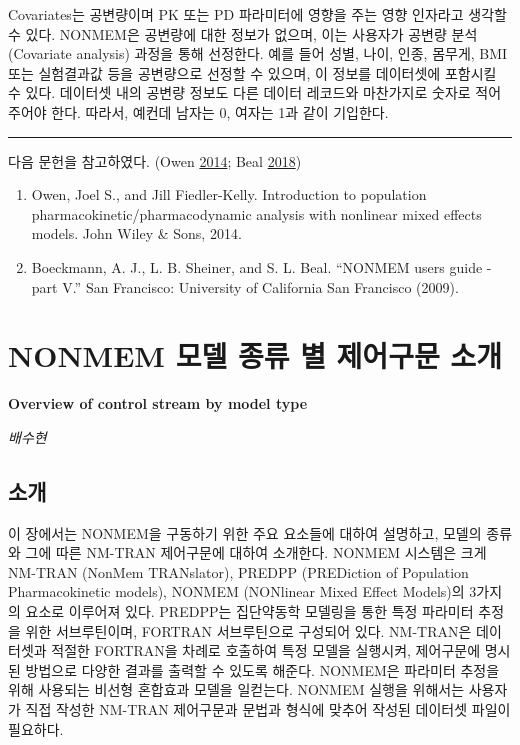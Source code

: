 \documentclass[
  10pt,
]{krantz}
\providecommand{\tightlist}{%
  \setlength{\itemsep}{0pt}\setlength{\parskip}{0pt}}
\begin{document}
Covariates는 공변량이며 PK 또는 PD 파라미터에 영향을 주는 영향 인자라고 생각할 수 있다. NONMEM은 공변량에 대한 정보가 없으며, 이는 사용자가 공변량 분석(Covariate analysis) 과정을 통해 선정한다. 예를 들어 성별, 나이, 인종, 몸무게, BMI 또는 실험결과값 등을 공변량으로 선정할 수 있으며, 이 정보를 데이터셋에 포함시킬 수 있다. 데이터셋 내의 공변량 정보도 다른 데이터 레코드와 마찬가지로 숫자로 적어주어야 한다. 따라서, 예컨데 남자는 0, 여자는 1과 같이 기입한다.

\begin{center}\rule{0.5\linewidth}{0.5pt}\end{center}

다음 문헌을 참고하였다. (Owen \protect\hyperlink{ref-kelly}{2014}; Beal \protect\hyperlink{ref-nonmem}{2018})

\begin{enumerate}
\def\labelenumi{\arabic{enumi}.}
\tightlist
\item
  Owen, Joel S., and Jill Fiedler-Kelly. Introduction to population pharmacokinetic/pharmacodynamic analysis with nonlinear mixed effects models. John Wiley \& Sons, 2014.
\item
  Boeckmann, A. J., L. B. Sheiner, and S. L. Beal. ``NONMEM users guide - part V.'' San Francisco: University of California San Francisco (2009).
\end{enumerate}

\hypertarget{control-stream}{%
\chapter{NONMEM 모델 종류 별 제어구문 소개}\label{control-stream}}

\textbf{Overview of control stream by model type}

\emph{배수현}

\hypertarget{uxc18cuxac1c-1}{%
\section{소개}\label{uxc18cuxac1c-1}}

이 장에서는 NONMEM을 구동하기 위한 주요 요소들에 대하여 설명하고, 모델의 종류와 그에 따른 NM-TRAN 제어구문에 대하여 소개한다. NONMEM 시스템은 크게 NM-TRAN (NonMem TRANslator), PREDPP (PREDiction of Population Pharmacokinetic models), NONMEM (NONlinear Mixed Effect Models)의 3가지의 요소로 이루어져 있다. PREDPP는 집단약동학 모델링을 통한 특정 파라미터 추정을 위한 서브루틴이며, FORTRAN 서브루틴으로 구성되어 있다. NM-TRAN은 데이터셋과 적절한 FORTRAN을 차례로 호출하여 특정 모델을 실행시켜, 제어구문에 명시된 방법으로 다양한 결과를 출력할 수 있도록 해준다. NONMEM은 파라미터 추정을 위해 사용되는 비선형 혼합효과 모델을 일컫는다. NONMEM 실행을 위해서는 사용자가 직접 작성한 NM-TRAN 제어구문과 문법과
형식에 맞추어 작성된 데이터셋 파일이 필요하다. 
\end{document}
